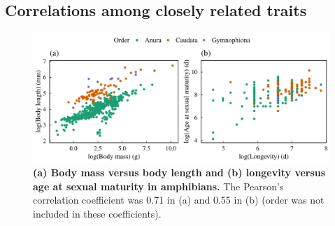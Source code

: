 \subsection*{Correlations among closely related traits}

\begin{figure}[h!]
\centering
\includegraphics[scale=0.85]{Supporting/Chapter2/Figures/Correlations/MatLong_BMBL_amphibians}
\caption[(a) Body mass versus body length and (b) longevity versus age at sexual maturity in amphibians]{\textbf{(a) Body mass versus body length and (b) longevity versus age at sexual maturity in amphibians.} The Pearson's correlation coefficient was 0.71 in (a) and 0.55 in (b) (order was not included in these coefficients).} 
\label{SI2_amphibians}
\end{figure}

